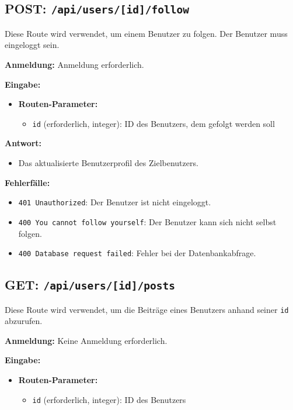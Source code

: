 \documentclass[a4paper,12pt]{article}
\begin{document}
\subsection{POST: \texttt{/api/users/[id]/follow}}

Diese Route wird verwendet, um einem Benutzer zu folgen. Der Benutzer muss
eingeloggt sein.

\textbf{Anmeldung:} Anmeldung erforderlich.

\textbf{Eingabe:}
\begin{itemize}
    \item \textbf{Routen-Parameter:}
    \begin{itemize}
        \item \texttt{id} (erforderlich, integer):
            ID des Benutzers, dem gefolgt werden soll
    \end{itemize}
\end{itemize}

\textbf{Antwort:}
\begin{itemize}
    \item Das aktualisierte Benutzerprofil des Zielbenutzers.
\end{itemize}

\textbf{Fehlerfälle:}
\begin{itemize}
    \item \texttt{401 Unauthorized}:
        Der Benutzer ist nicht eingeloggt.
    \item \texttt{400 You cannot follow yourself}:
        Der Benutzer kann sich nicht selbst folgen.
    \item \texttt{400 Database request failed}:
        Fehler bei der Datenbankabfrage.
\end{itemize}

\subsection{GET: \texttt{/api/users/[id]/posts}}

Diese Route wird verwendet, um die Beiträge eines Benutzers anhand seiner
\texttt{id} abzurufen.

\textbf{Anmeldung:} Keine Anmeldung erforderlich.

\textbf{Eingabe:}
\begin{itemize}
    \item \textbf{Routen-Parameter:}
    \begin{itemize}
        \item \texttt{id} (erforderlich, integer):
            ID des Benutzers
    \end{itemize}
\end{itemize}
\end{document}
